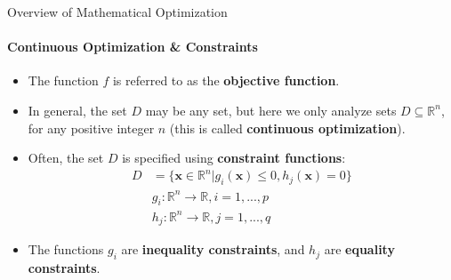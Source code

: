 \documentclass{beamer}
\renewcommand{\vec}{\mathbf}
\begin{document}
	\begin{frame}{Overview of Mathematical Optimization}
		\framesubtitle{Continuous Optimization \& Constraints}
		\begin{itemize}
			\item The function $f$ is referred to as the \textbf{objective function}.
			\item In general, the set $D$ may be any set, but here we only analyze sets $D\subseteq\mathbb{R}^n$, for any positive integer $n$ (this is called \textbf{continuous optimization}).
			\item Often, the set $D$ is specified using \textbf{constraint functions}:
			\begin{align*}
				D &= \{\vec{x}\in\mathbb{R}^n | g_i(\vec{x}) \leq 0, h_j(\vec{x}) = 0\}\\
				&g_i:\mathbb{R}^n\to\mathbb{R}, i=1,...,p\\
				&h_j:\mathbb{R}^n\to\mathbb{R}, j = 1,...,q
			\end{align*}
			\item The functions $g_i$ are \textbf{inequality constraints}, and $h_j$ are \textbf{equality constraints}.
		\end{itemize}
	\end{frame}
%
%
\end{document}
